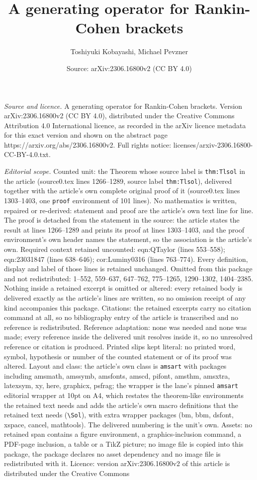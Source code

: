 \documentclass[10pt,a4paper]{amsart}
\title[A generating operator for Rankin-Cohen brackets]{A generating operator for Rankin-Cohen brackets}
\author{Toshiyuki Kobayashi, Michael Pevzner}
\date{Source: arXiv:2306.16800v2 (CC BY 4.0)}
\begin{document}
\maketitle

\noindent\emph{Source and licence.} A generating operator for Rankin-Cohen brackets. Version arXiv:2306.16800v2 (CC BY 4.0), distributed under the Creative Commons Attribution 4.0 International licence, as recorded in the arXiv licence metadata for this exact version and shown on the abstract page https://arxiv.org/abs/2306.16800v2. Full rights notice: licenses/arxiv-2306.16800-CC-BY-4.0.txt.\par\smallskip

\noindent\textit{Editorial scope.} Counted unit: the Theorem whose source label is \texttt{thm:Tlsol} in the article (source0.tex lines 1266--1289, source label \texttt{thm:Tlsol}), delivered together with the article's own complete original proof of it (source0.tex lines 1303--1403, one \texttt{proof} environment of 101 lines). No mathematics is written, repaired or re-derived: statement and proof are the article's own text line for line. The proof is detached from the statement in the source: the article states the result at lines 1266--1289 and prints its proof at lines 1303--1403, and the proof environment's own header names the statement, so the association is the article's own. Required context retained uncounted: eqn:QTaylor (lines 553--558); eqn:23031847 (lines 638--646); cor:Luminy0316 (lines 763--774). Every definition, display and label of those lines is retained unchanged. Omitted from this package and not redistributed: 1--552, 559--637, 647--762, 775--1265, 1290--1302, 1404--2385. Nothing inside a retained excerpt is omitted or altered: every retained body is delivered exactly as the article's lines are written, so no omission receipt of any kind accompanies this package. Citations: the retained excerpts carry no citation command at all, so no bibliography entry of the article is transcribed and no reference is redistributed. Reference adaptation: none was needed and none was made; every reference inside the delivered unit resolves inside it, so no unresolved reference or citation is produced. Printed slips kept literal: no printed word, symbol, hypothesis or number of the counted statement or of its proof was altered. Layout and class: the article's own class is \texttt{amsart} with packages including amsmath, amssymb, amsfonts, amscd, pifont, amsthm, amsxtra, latexsym, xy, here, graphicx, psfrag; the wrapper is the lane's pinned \texttt{amsart} editorial wrapper at 10pt on A4, which restates the theorem-like environments the retained text needs and adds the article's own macro definitions that the retained text needs (\texttt{\textbackslash Sol}), with extra wrapper packages (bm, bbm, dsfont, xspace, cancel, mathtools). The delivered numbering is the unit's own. Assets: no retained span contains a figure environment, a graphics-inclusion command, a PDF-page inclusion, a table or a TikZ picture; no image file is copied into this package, the package declares no asset dependency and no image file is redistributed with it. Licence: version arXiv:2306.16800v2 of this article is distributed under the Creative Commons 
\end{document}
